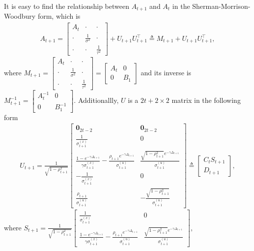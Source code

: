 It is easy to find the relationship between $A_{t+1}$ and  $A_{t}$ in the Sherman-Morrison-Woodbury form, which is 
\begin{align*} A_{t+1} = 
\begin{bmatrix}
A_t & \cdot & \cdot  \\ \cdot &\frac{1}{\sigma^2} &\cdot  \\ \cdot  & \cdot  & \frac{1}{\tau^2} 
\end{bmatrix} + U_{t+1}U_{t+1}^\top \triangleq M_{t+1}  + U_{t+1}U_{t+1}^\top,
\end{align*}
where $M_{t+1} = \begin{bmatrix}
A_t & \cdot & \cdot  \\ \cdot &\frac{1}{\sigma^2} &\cdot  \\ \cdot  & \cdot  & \frac{1}{\tau^2}
\end{bmatrix}  = \begin{bmatrix}
A_t & 0 \\ 0 & B_1
\end{bmatrix}$ 
and its inverse is $M_{t+1}^{-1} =\begin{bmatrix}
A_t^{-1} & 0 \\ 0 & B_1^{-1}
\end{bmatrix}$. Additionallly, $U$ is a $2t+2 \times 2$ matrix in the following form 
\begin{align*}
U_{t+1} = \frac{1}{\sqrt{ 1-\rho_{t+1}^2} } \begin{bmatrix}
\mathbf{0}_{2t-2} & \mathbf{0}_{2t-2}  \\ \frac{1}{\sigma_{t+1}^{\left(x\right)}}& 0 \\
\frac{1-e^{-\gamma \Delta_{t+1}}}{\gamma \sigma_{t+1}^{\left(x\right)}}-\frac{\rho_{t+1} e^{-\gamma\Delta_{t+1}}}{\sigma_{t+1}^{\left(u\right)}} & \frac{\sqrt{1-\rho_{t+1}^2}e^{-\gamma\Delta_{t+1}}}{\sigma_{t+1}^{\left(u\right)}} \\
-\frac{1}{\sigma_{t+1}^{\left(x\right)}} & 0 \\
\frac{\rho_{t+1}}{\sigma_{t+1}^{\left(u\right)}} & -\frac{\sqrt{1-\rho_{t+1}^2}}{\sigma_{t+1}^{\left(u\right)}}
\end{bmatrix} \triangleq  \begin{bmatrix}
C_t S_{t+1} \\ D_{t+1}
\end{bmatrix},
\end{align*}
where $S_{t+1} = \frac{1}{\sqrt{ 1-\rho_{t+1}^2} } \begin{bmatrix}
\frac{1}{\sigma_{t+1}^{\left(x\right)}}& 0 \\
\frac{1-e^{-\gamma \Delta_{t+1}}}{\gamma \sigma_{t+1}^{\left(x\right)}}-\frac{\rho_{t+1} e^{-\gamma\Delta_{t+1}}}{\sigma_{t+1}^{\left(u\right)}} & \frac{\sqrt{1-\rho_{t+1}^2}e^{-\gamma\Delta_{t+1}}}{\sigma_{t+1}^{\left(u\right)}}
\end{bmatrix}$,\\
